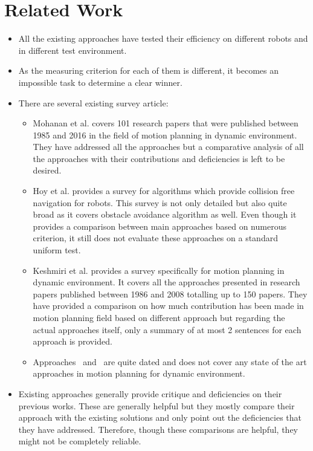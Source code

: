 \documentclass[rnd]{mas_proposal}
\begin{document}
\chapter{Related Work}
\begin{itemize}
    \item All the existing approaches have tested their efficiency on different robots and in different test environment.
    \item As the measuring criterion for each of them is different, it becomes an impossible task to determine a clear winner.
    \item There are several existing survey article:
        \begin{itemize}
            \item Mohanan et al.\cite{mohanan2018a} covers 101 research papers that were published between 1985 and 2016 in the field of motion planning in dynamic environment. 
                They have addressed all the approaches but a comparative analysis of all the approaches with their contributions and deficiencies is left to be desired.
            \item Hoy et al.\cite{hoy2015algorithms} provides a survey for algorithms which provide collision free navigation for robots. 
                This survey is not only detailed but also quite broad as it covers obstacle avoidance algorithm as well. 
                Even though it provides a comparison between main approaches based on numerous criterion, it still does not evaluate these approaches on a standard uniform test.
            \item Keshmiri et al.\cite{keshmiri2009overview} provides a survey specifically for motion planning in dynamic environment. 
                It covers all the approaches presented in research papers published between 1986 and 2008 totalling up to 150 papers. 
                They have provided a comparison on how much contribution has been made in motion planning field based on different approach but regarding the actual approaches itself, only a summary of at most 2 sentences for each approach is provided.
            \item Approaches~\cite{fujimura1991motion} and~\cite{tsubouchi1996motion} are quite dated and does not cover any state of the art approaches in motion planning for dynamic environment.
        \end{itemize}
    \item Existing approaches generally provide critique and deficiencies on their previous works. These are generally helpful but they mostly compare their approach with the existing solutions and only point out the deficiencies that they have addressed. Therefore, though these comparisons are helpful, they might not be completely reliable.
\end{itemize}
\end{document}

